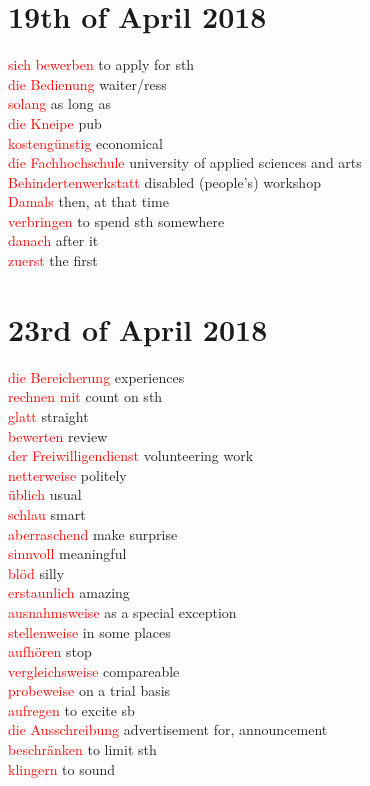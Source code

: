 \documentclass{article}
\begin{document}
\begin{multicols}{2}
	\section*{19th of April 2018}
	\textcolor{red}{sich bewerben} to apply for sth\\
	\textcolor{red}{die Bedienung} waiter/ress\\
	\textcolor{red}{solang} as long as \\ 
	\textcolor{red}{die Kneipe} pub\\
	\textcolor{red}{kostengünstig} economical\\ 
	\textcolor{red}{die Fachhochschule} university of applied sciences and arts\\ 
	\textcolor{red}{Behindertenwerkstatt} disabled (people's) workshop \\
	\textcolor{red}{Damals} then, at that time\\ 
	\textcolor{red}{verbringen} to spend sth somewhere\\ 
	\textcolor{red}{danach} after it\\
	\textcolor{red}{zuerst} the first \\ 
	
	\section*{23rd of April 2018}
	\textcolor{red}{die Bereicherung} experiences\\
	\textcolor{red}{rechnen mit} count on sth\\
	\textcolor{red}{glatt} straight\\
	\textcolor{red}{bewerten} review\\
	\textcolor{red}{der Freiwilligendienst} volunteering work\\
	\textcolor{red}{netterweise} politely\\
	\textcolor{red}{üblich} usual\\
	\textcolor{red}{schlau} smart\\ 
	\textcolor{red}{aberraschend} make surprise\\ 
	\textcolor{red}{sinnvoll} meaningful\\
	\textcolor{red}{blöd} silly \\ 
	\textcolor{red}{erstaunlich} amazing\\ 
	\textcolor{red}{ausnahmsweise} as a special exception\\
	\textcolor{red}{stellenweise} in some places \\ 
	\textcolor{red}{aufhören} stop\\
	\textcolor{red}{vergleichsweise} compareable\\
	\textcolor{red}{probeweise} on a trial basis\\
	\textcolor{red}{aufregen} to excite sb\\
	\textcolor{red}{die Ausschreibung} advertisement for, announcement\\
	\textcolor{red}{beschränken} to limit sth\\
	\textcolor{red}{klingern} to sound\\
	
	
	

	
	
	
	
	
	\end{multicols}

	\printglossaries
	
\end{document}
